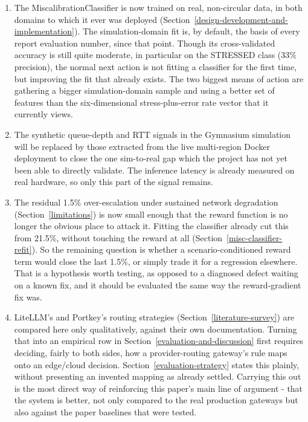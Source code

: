 \begin{enumerate}
\item The MiscalibrationClassifier is now trained on real,
non-circular data, in both domains to which it ever was deployed
(Section~\ref{design-development-and-implementation}). The
simulation-domain fit is, by default, the basis of every report
evaluation number, since that point. Though its cross-validated
accuracy is still quite moderate, in particular on the STRESSED class
(33\% precision), the normal next action is not fitting a classifier
for the first time, but improving the fit that already exists. The two
biggest means of action are gathering a bigger simulation-domain
sample and using a better set of features than the six-dimensional
stress-plus-error rate vector that it currently views.

\item The synthetic queue-depth
and RTT signals in the Gymnasium simulation will be replaced by those
extracted from the live multi-region Docker deployment to close the
one sim-to-real gap which the project has not yet been able to
directly validate. The inference latency is already measured on real
hardware, so only this part of the signal remains.

\item The residual 1.5\% over-escalation under sustained network
degradation (Section~\ref{limitations}) is now small enough that the reward function
is no longer the obvious place to attack it. Fitting the classifier
already cut this from 21.5\%, without touching the reward at all
(Section~\ref{misc-classifier-refit}). So the remaining question is whether a
scenario-conditioned reward term would close the last 1.5\%, or simply
trade it for a regression elsewhere. That is a hypothesis worth
testing, as opposed to a diagnosed defect waiting on a known fix, and it should
be evaluated the same way the reward-gradient fix was.

\item LiteLLM's and Portkey's routing strategies (Section~\ref{literature-survey}) are
compared here only qualitatively, against their own documentation.
Turning that into an empirical row in Section~\ref{evaluation-and-discussion} first requires
deciding, fairly to both sides, how a provider-routing gateway's rule
maps onto an edge/cloud decision. Section~\ref{evaluation-strategy} states this plainly,
without presenting an invented mapping as already settled. Carrying this out is the most direct way of reinforcing this paper's
main line of argument - that the system is better, not only compared
to the real production gateways but also against the paper baselines
that were tested.


\end{enumerate}
